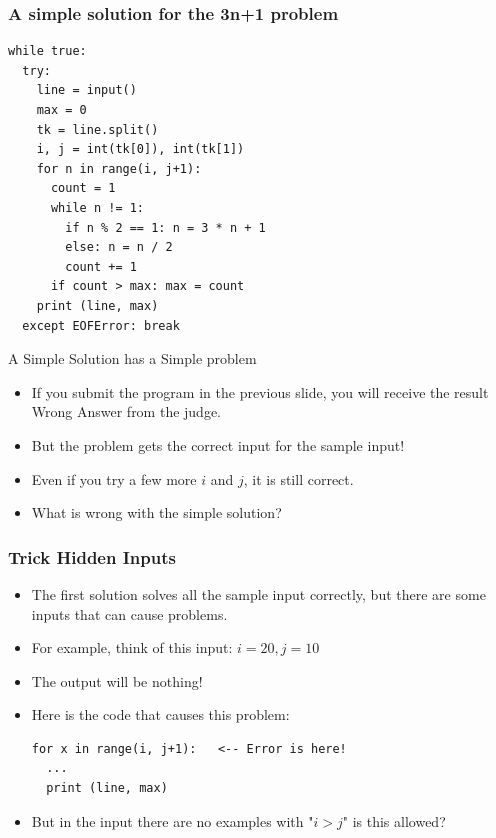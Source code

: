 \begin{frame}[fragile]
  \frametitle{A simple solution for the 3n+1 problem}
  {\smaller
\begin{verbatim}
while true:
  try:
    line = input()
    max = 0
    tk = line.split()
    i, j = int(tk[0]), int(tk[1])
    for n in range(i, j+1):
      count = 1
      while n != 1:
        if n % 2 == 1: n = 3 * n + 1
        else: n = n / 2
        count += 1
      if count > max: max = count
    print (line, max)
  except EOFError: break
\end{verbatim}}
\end{frame}

\begin{frame}{A Simple Solution has a Simple problem}

  \begin{itemize}
    \item If you submit the program in the previous slide, you will receive the result \alert{Wrong Answer} from the judge.
    \bigskip

    \item But the problem gets the correct input for the sample input!
    \item Even if you try a few more $i$ and $j$, it is still correct.
    \bigskip

    \item What is wrong with the simple solution? 
  \end{itemize}
\end{frame}

\begin{frame}[fragile]
  \frametitle{Trick Hidden Inputs}

  \begin{itemize}
    \item The first solution solves all the sample input correctly, but
    there are some inputs that can cause problems.
    \bigskip

    \item For example, think of this input: \alert{$i = 20, j = 10$}
    \item The output will be nothing!
    \bigskip

    \item Here is the code that causes this problem:
\begin{verbatim}
for x in range(i, j+1):   <-- Error is here!
  ...
  print (line, max)
\end{verbatim}
    \bigskip

    \item But in the input there are no examples with "$i > j$" is this
    allowed?
  \end{itemize}
\end{frame}

